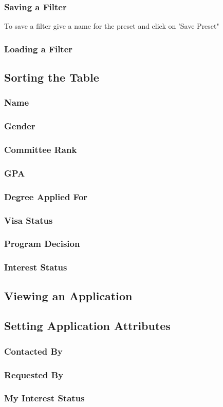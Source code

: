 \documentclass[fontsize=12pt,paper=letter,twoside]{scrartcl}
\begin{document}
\clearpage 
\subsubsection{Saving a Filter}
To save a filter give a name for the preset and click on 'Save Preset"
\subsubsection{Loading a Filter}
\subsection{Sorting the Table}
\subsubsection{Name}
\subsubsection{Gender}
\subsubsection{Committee Rank}
\subsubsection{GPA}
\subsubsection{Degree Applied For}
\subsubsection{Visa Status}
\subsubsection{Program Decision}
\subsubsection{Interest Status}
\subsection{Viewing an Application}
\subsection{Setting Application Attributes}
\subsubsection{Contacted By}
\subsubsection{Requested By}
\subsubsection{My Interest Status}
\end{document}
